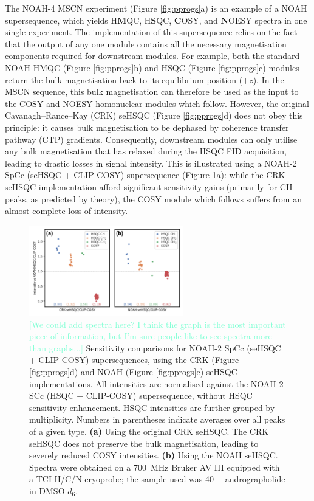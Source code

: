 \documentclass[draft,11pt]{article}
\newcommand*{\carbon}{\ce{^{13}C}}
\newcommand*{\nitrogen}{\ce{^{15}N}}
\newcommand*{\hl}[1]{\textcolor{Aquamarine}{[#1]}}
\newcommand*{\figref}[1]{Figure \ref{fig:#1}}
\newcommand*{\andro}{Spectra were obtained on a \SI{700}{\MHz} Bruker AV III equipped with a TCI H/C/N cryoprobe; the sample used was \SI{40}{\milli\molar} andrographolide in DMSO-$d_6$.}
\begin{document}
The NOAH-4 MSCN experiment (\figref{pprogs}a) is an example of a NOAH supersequence, which yields \nitrogen{} H\textbf{M}QC, \carbon{} H\textbf{S}QC, \textbf{C}OSY, and \textbf{N}OESY spectra in one single experiment.
The implementation of this supersequence relies on the fact that the output of any one module contains all the necessary magnetisation components required for downstream modules.
For example, both the standard NOAH HMQC (\figref{pprogs}b) and HSQC (\figref{pprogs}c) modules return the bulk magnetisation back to its equilibrium position ($+z$).
In the MSCN sequence, this bulk magnetisation can therefore be used as the input to the COSY and NOESY homonuclear modules which follow.
However, the original Cavanagh--Rance--Kay (CRK) seHSQC (\figref{pprogs}d) does not obey this principle: it causes bulk magnetisation to be dephased by coherence transfer pathway (CTP) gradients.
Consequently, downstream modules can only utilise any bulk magnetisation that has relaxed during the HSQC FID acquisition, leading to drastic losses in signal intensity.
This is illustrated using a NOAH-2 SpCc (seHSQC + CLIP-COSY\autocite{Koos2016ACIE}) supersequence (\figref{spor_spv2}a): while the CRK seHSQC implementation afford significant sensitivity gains (primarily for CH peaks, as predicted by theory\autocite{sehsqc_sens}), the COSY module which follows suffers from an almost complete loss of intensity.

\begin{figure}
    \centering
    \includegraphics[width=0.6\textwidth]{spor_spv2_comp.png}
    \caption{
        \hl{We could add spectra here? I think the graph is the most important piece of information, but I'm sure people like to see spectra more than graphs...}
        Sensitivity comparisons for NOAH-2 SpCc (seHSQC + CLIP-COSY) supersequences, using the CRK (\figref{pprogs}d) and NOAH (\figref{pprogs}e) seHSQC implementations.
        All intensities are normalised against the NOAH-2 SCc (HSQC + CLIP-COSY) supersequence, without HSQC sensitivity enhancement.
        HSQC intensities are further grouped by multiplicity.
        Numbers in parentheses indicate averages over all peaks of a given type.
        \textbf{(a)} Using the original CRK seHSQC.
        The CRK seHSQC does not preserve the bulk magnetisation, leading to severely reduced COSY intensities.
        \textbf{(b)} Using the NOAH seHSQC.
        \andro{}
    }
    \label{fig:spor_spv2}
\end{figure}
\end{document}
